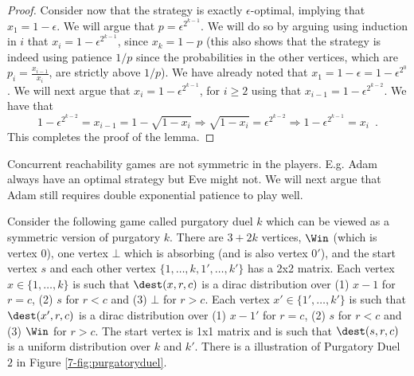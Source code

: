 \begin{proof}
Consider now that the strategy is exactly $\epsilon$-optimal, implying that $x_1=1-\epsilon$. 
We will argue that $p=\epsilon^{2^{k-1}}$.
We will do so by arguing  using induction in $i$ that $x_i=1-\epsilon^{2^{k-1}}$, since $x_k=1-p$ (this also shows that the strategy is indeed using patience $1/p$ since the probabilities in the other vertices, which are $p_i=\frac{x_{i-1}}{x_i}$, are strictly above $1/p$).
We have already noted that  $x_1=1-\epsilon=1-\epsilon^{2^0}$.
We will next argue that $x_i=1-\epsilon^{2^{k-1}}$, for $i\geq 2$ using that $x_{i-1}=1-\epsilon^{2^{k-2}}$.
We have that \[
1-\epsilon^{2^{k-2}}=x_{i-1}=1-\sqrt{1-x_{i}}\Rightarrow \sqrt{1-x_{i}}= \epsilon^{2^{k-2}}\Rightarrow
1-\epsilon^{2^{k-1}}=x_i\enspace .
\]
This completes the proof of the lemma.
\end{proof}

Concurrent reachability games are not symmetric in the players. E.g. Adam always have an optimal strategy but Eve might not. We will next argue that Adam still requires double exponential patience to play well.

Consider the following game called purgatory duel $k$ which can be viewed as a symmetric version of purgatory $k$.
There are $3+2k$ vertices, $\Win$ (which is vertex 0), one vertex $\bot$ which is absorbing (and is also vertex $0'$), and the start vertex $s$ and each other vertex $\{1,\dots, k,1',\dots,k'\}$ has a 2x2 matrix. Each vertex $x\in \{1,\dots, k\}$ is such that $\dest(x,r,c)$ is a dirac distribution over (1) $x-1$ for $r=c$, (2) $s$ for $r<c$ and (3) $\bot$ for $r>c$.
 Each vertex $x'\in \{1',\dots, k'\}$ is such that $\dest(x',r,c)$ is a dirac distribution over (1) $x-1'$ for $r=c$, (2) $s$ for $r<c$ and (3) $\Win$ for $r>c$. The start vertex is 1x1 matrix and is such that $\dest(s,r,c)$ is a uniform distribution over $k$ and $k'$.
There is a illustration of Purgatory Duel $2$ in Figure \ref{7-fig:purgatoryduel}.


